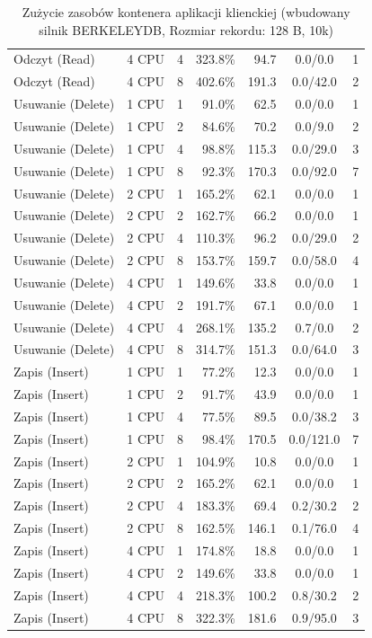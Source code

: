 \begin{table}[ht]
{\begin{tabular}{llcrrcc}
Odczyt (Read) & 4 CPU & 4 & 323.8\% & 94.7 & 0.0/0.0 & 1 \\
Odczyt (Read) & 4 CPU & 8 & 402.6\% & 191.3 & 0.0/42.0 & 2 \\
Usuwanie (Delete) & 1 CPU & 1 & 91.0\% & 62.5 & 0.0/0.0 & 1 \\
Usuwanie (Delete) & 1 CPU & 2 & 84.6\% & 70.2 & 0.0/9.0 & 2 \\
Usuwanie (Delete) & 1 CPU & 4 & 98.8\% & 115.3 & 0.0/29.0 & 3 \\
Usuwanie (Delete) & 1 CPU & 8 & 92.3\% & 170.3 & 0.0/92.0 & 7 \\
Usuwanie (Delete) & 2 CPU & 1 & 165.2\% & 62.1 & 0.0/0.0 & 1 \\
Usuwanie (Delete) & 2 CPU & 2 & 162.7\% & 66.2 & 0.0/0.0 & 1 \\
Usuwanie (Delete) & 2 CPU & 4 & 110.3\% & 96.2 & 0.0/29.0 & 2 \\
Usuwanie (Delete) & 2 CPU & 8 & 153.7\% & 159.7 & 0.0/58.0 & 4 \\
Usuwanie (Delete) & 4 CPU & 1 & 149.6\% & 33.8 & 0.0/0.0 & 1 \\
Usuwanie (Delete) & 4 CPU & 2 & 191.7\% & 67.1 & 0.0/0.0 & 1 \\
Usuwanie (Delete) & 4 CPU & 4 & 268.1\% & 135.2 & 0.7/0.0 & 2 \\
Usuwanie (Delete) & 4 CPU & 8 & 314.7\% & 151.3 & 0.0/64.0 & 3 \\
Zapis (Insert) & 1 CPU & 1 & 77.2\% & 12.3 & 0.0/0.0 & 1 \\
Zapis (Insert) & 1 CPU & 2 & 91.7\% & 43.9 & 0.0/0.0 & 1 \\
Zapis (Insert) & 1 CPU & 4 & 77.5\% & 89.5 & 0.0/38.2 & 3 \\
Zapis (Insert) & 1 CPU & 8 & 98.4\% & 170.5 & 0.0/121.0 & 7 \\
Zapis (Insert) & 2 CPU & 1 & 104.9\% & 10.8 & 0.0/0.0 & 1 \\
Zapis (Insert) & 2 CPU & 2 & 165.2\% & 62.1 & 0.0/0.0 & 1 \\
Zapis (Insert) & 2 CPU & 4 & 183.3\% & 69.4 & 0.2/30.2 & 2 \\
Zapis (Insert) & 2 CPU & 8 & 162.5\% & 146.1 & 0.1/76.0 & 4 \\
Zapis (Insert) & 4 CPU & 1 & 174.8\% & 18.8 & 0.0/0.0 & 1 \\
Zapis (Insert) & 4 CPU & 2 & 149.6\% & 33.8 & 0.0/0.0 & 1 \\
Zapis (Insert) & 4 CPU & 4 & 218.3\% & 100.2 & 0.8/30.2 & 2 \\
Zapis (Insert) & 4 CPU & 8 & 322.3\% & 181.6 & 0.9/95.0 & 3 \\
\bottomrule
\end{tabular}%
}
\caption{Zużycie zasobów kontenera aplikacji klienckiej (wbudowany silnik BERKELEYDB, Rozmiar rekordu: 128 B, 10k)}
\label{tab:resources_berkeleydb_small_10000}
\end{table}
